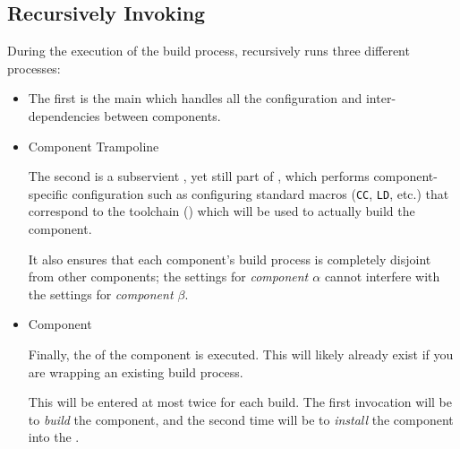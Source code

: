 \subsection{Recursively Invoking \make}

During the execution of the build process, \lmsbw recursively runs
three different \makefile processes:

\begin{itemize}
\item \lmsbw \makefile

  The first is the main \lmsbw \makefile which handles all the
  configuration and inter-dependencies between components.

\item Component Trampoline \makefile

  The second is a subservient \makefile, yet still part of \lmsbw,
  which performs component-specific configuration such as configuring
  standard \makefile macros (\texttt{CC}, \texttt{LD}, etc.) that
  correspond to the toolchain () which will
  be used to actually build the component.

  It also ensures that each component's build process is completely
  disjoint from other components; the settings for \emph{component $\alpha$}
  cannot interfere with the settings for \emph{component $\beta$}.

\item Component \makefile

  Finally, the \makefile of the component is executed.  This will
  likely already exist if you are wrapping an existing build process.

  This \makefile will be entered at most twice for each build.  The
  first invocation will be to \emph{build} the component, and the
  second time will be to \emph{install} the component into the
  \destdir.
\end{itemize}
